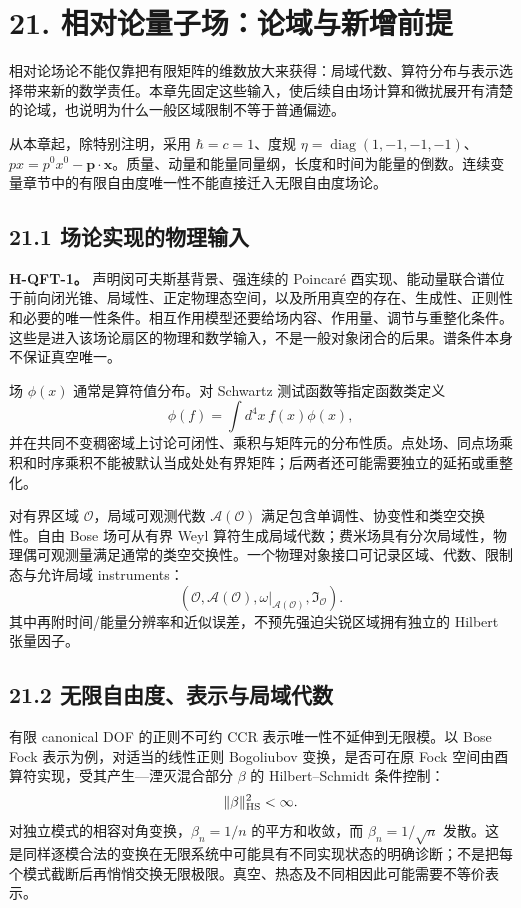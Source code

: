 \documentclass[
  11pt,
  oneside]{book}
\begin{document}
\chapter{21. 相对论量子场：论域与新增前提}\label{ch-21}\hypertarget{ch-21}{}

相对论场论不能仅靠把有限矩阵的维数放大来获得：局域代数、算符分布与表示选择带来新的数学责任。本章先固定这些输入，使后续自由场计算和微扰展开有清楚的论域，也说明为什么一般区域限制不等于普通偏迹。

从本章起，除特别注明，采用 \(\hbar=c=1\)、度规
\(\eta=\operatorname{diag}(1,-1,-1,-1)\)、\(p x=p^0x^0-\mathbf p\cdot\mathbf x\)。质量、动量和能量同量纲，长度和时间为能量的倒数。连续变量章节中的有限自由度唯一性不能直接迁入无限自由度场论。

\section{21.1 场论实现的物理输入}

\textbf{H-QFT-1。} 声明闵可夫斯基背景、强连续的 Poincaré
酉实现、能动量联合谱位于前向闭光锥、局域性、正定物理态空间，以及所用真空的存在、生成性、正则性和必要的唯一性条件。相互作用模型还要给场内容、作用量、调节与重整化条件。这些是进入该场论扇区的物理和数学输入，不是一般对象闭合的后果。谱条件本身不保证真空唯一。

场 \(\phi(x)\) 通常是算符值分布。对 Schwartz 测试函数等指定函数类定义 \[
\phi(f)=\int d^4x\,f(x)\phi(x),
\]
并在共同不变稠密域上讨论可闭性、乘积与矩阵元的分布性质。点处场、同点场乘积和时序乘积不能被默认当成处处有界矩阵；后两者还可能需要独立的延拓或重整化。

对有界区域 \(\mathcal O\)，局域可观测代数 \(\mathcal A(\mathcal O)\)
满足包含单调性、协变性和类空交换性。自由 Bose 场可从有界 Weyl
算符生成局域代数；费米场具有分次局域性，物理偶可观测量满足通常的类空交换性。一个物理对象接口可记录区域、代数、限制态与允许局域
instruments： \[
(\mathcal O,\mathcal A(\mathcal O),\omega|_{\mathcal A(\mathcal O)},\mathfrak I_{\mathcal O}).
\] 其中再附时间/能量分辨率和近似误差，不预先强迫尖锐区域拥有独立的
Hilbert 张量因子。

\section{21.2 无限自由度、表示与局域代数}

有限 canonical DOF 的正则不可约 CCR 表示唯一性不延伸到无限模。以 Bose
Fock 表示为例，对适当的线性正则 Bogoliubov 变换，是否可在原 Fock
空间由酉算符实现，受其产生---湮灭混合部分 \(\beta\) 的 Hilbert--Schmidt
条件控制： \[
\|\beta\|_{\rm HS}^2<\infty.
\] 对独立模式的相容对角变换，\(\beta_n=1/n\) 的平方和收敛，而
\(\beta_n=1/\sqrt n\)
发散。这是同样逐模合法的变换在无限系统中可能具有不同实现状态的明确诊断；不是把每个模式截断后再悄悄交换无限极限。真空、热态及不同相因此可能需要不等价表示。
\end{document}
